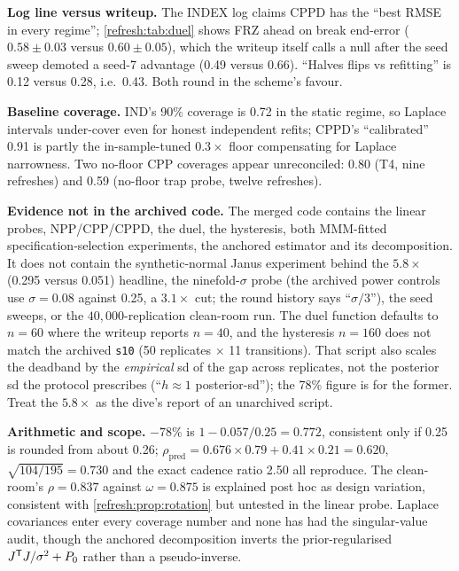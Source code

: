 \begin{reviewernote}[(compiler)]
\textbf{Log line versus writeup.} The INDEX log claims CPPD has the ``best RMSE in every regime''; \cref{refresh:tab:duel} shows FRZ ahead on break end-error ($0.58 \pm 0.03$ versus $0.60 \pm 0.05$), which the writeup itself calls a null after the seed sweep demoted a seed-7 advantage (0.49 versus 0.66). ``Halves flips vs refitting'' is 0.12 versus 0.28, i.e.\ 0.43. Both round in the scheme's favour.

\textbf{Baseline coverage.} IND's 90\% coverage is 0.72 in the static regime, so Laplace intervals under-cover even for honest independent refits; CPPD's ``calibrated'' 0.91 is partly the in-sample-tuned $0.3\times$ floor compensating for Laplace narrowness. Two no-floor CPP coverages appear unreconciled: 0.80 (T4, nine refreshes) and 0.59 (no-floor trap probe, twelve refreshes).

\textbf{Evidence not in the archived code.} The merged code contains the linear probes, NPP/CPP/CPPD, the duel, the hysteresis, both MMM-fitted specification-selection experiments, the anchored estimator and its decomposition. It does not contain the synthetic-normal Janus experiment behind the $5.8\times$ (0.295 versus 0.051) headline, the ninefold-$\sigma$ probe (the archived power controls use $\sigma = 0.08$ against 0.25, a $3.1\times$ cut; the round history says ``$\sigma/3$''), the seed sweeps, or the $40{,}000$-replication clean-room run. The duel function defaults to $n = 60$ where the writeup reports $n = 40$, and the hysteresis $n = 160$ does not match the archived \texttt{s10} (50 replicates $\times$ 11 transitions). That script also scales the deadband by the \emph{empirical} sd of the gap across replicates, not the posterior sd the protocol prescribes (``$h \approx 1$ posterior-sd''); the 78\% figure is for the former. Treat the $5.8\times$ as the dive's report of an unarchived script.

\textbf{Arithmetic and scope.} $-78\%$ is $1 - 0.057/0.25 = 0.772$, consistent only if 0.25 is rounded from about 0.26; $\rho_{\mathrm{pred}} = 0.676\times0.79 + 0.41\times0.21 = 0.620$, $\sqrt{104/195} = 0.730$ and the exact cadence ratio 2.50 all reproduce. The clean-room's $\rho = 0.837$ against $\omega = 0.875$ is explained post hoc as design variation, consistent with \cref{refresh:prop:rotation} but untested in the linear probe. Laplace covariances enter every coverage number and none has had the  singular-value audit, though the anchored decomposition inverts the prior-regularised $J^{\mathsf{T}} J/\sigma^2 + P_0$ rather than a pseudo-inverse.
\end{reviewernote}

